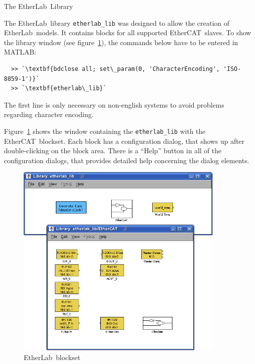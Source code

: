 \begin{ighsec}{The EtherLab\regTM\ Library}
\label{sec:lib}

The EtherLab\regTM\ library \texttt{etherlab\_lib} was designed to
allow the creation of EtherLab\regTM\ models. It contains blocks for
all supported EtherCAT\regTM\ slaves. To show the library window (see
figure~\ref{fig:blockset}), the commands below have to be entered in
MATLAB\regTM:

\begin{lstlisting}
  >> `\textbf{bdclose all; set\_param(0, 'CharacterEncoding', 'ISO-8859-1')}`
  >> `\textbf{etherlab\_lib}`
\end{lstlisting}

The first line is only necessary on non-english systems to avoid
problems regarding character encoding.

Figure~\ref{fig:blockset} shows the window containing the
\texttt{etherlab\_lib} with the EtherCAT\regTM\ blockset. Each block
has a configuration dialog, that shows up after double-clicking on the
block area. There is a ``Help'' button in all of the configuration
dialogs, that provides detailed help concerning the dialog elements.

\begin{figure}[H]
  \begin{center}
    \includegraphics[width=0.9\textwidth]{images/blockset.png}
    \caption{EtherLab\regTM\ blockset}
    \label{fig:blockset}
  \end{center}
\end{figure}


\end{ighsec}
